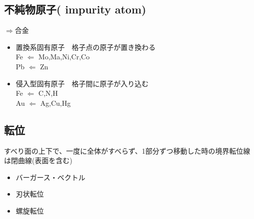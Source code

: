 \documentclass[a4j,twoside,openright,11pt]{jreport}
\begin{document}
\subsection{不純物原子( impurity atom)}
$\Rightarrow$合金\\
\begin{itemize}
\item 置換系固有原子　格子点の原子が置き換わる \\
Fe $\Leftarrow$ Mo,Ma,Ni,Cr,Co\\
Pb $\Leftarrow$ Zn\\

\item 侵入型固有原子　格子間に原子が入り込む\\
Fe $\Leftarrow$ C,N,H\\
Au $\Leftarrow$ Ag,Cu,Hg\\
\end{itemize}

\subsection{転位}
すべり面の上下で、一度に全体がすべらず、1部分ずつ移動した時の境界転位線は閉曲線(表面を含む)
\begin{itemize}
\item バーガース・ベクトル
\item 刃状転位
\item 螺旋転位
\end{itemize}
\end{document}
